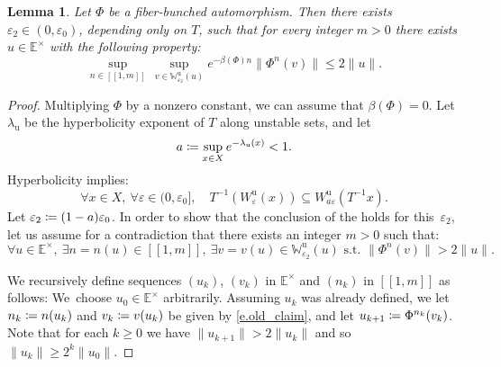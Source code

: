 \documentclass[10pt]{amsart}
\newcommand{\ldbrack}{[\![}
\newcommand{\rdbrack}{]\!]}
\def\vcentcolon{\mathrel{\mathop\ordinarycolon}}
\providecommand\ordinarycolon{:}
\providecommand*\coloneqq{\vcentcolon\mathrel{\mkern-1.2mu}=}
\theoremstyle{plain}
\newtheorem{lemma}[theorem]{Lemma}
\theoremstyle{definition}
\newcommand{\EE}{\mathbb{E}}
\newcommand{\WW}{\mathbb{W}}
\newcommand{\uu}{\mathrm{u}}
\let\epsilon\varepsilon
\begin{document}
\begin{lemma}\label{l.anti_claim}
Let $\Phi$ be a fiber-bunched automorphism.
Then there exists $\epsilon_2 \in (0,\epsilon_0)$, depending only on $T$, such that for every integer $m > 0$ there exists $u \in \EE^\times$ with the following property:
\[
\sup_{n \in \ldbrack 1, m \rdbrack} \, \sup_{v \in \WW^\uu_{\epsilon_2} (u)} e^{-\beta(\Phi) n} \| \Phi^n (v) \| \le 2 \|u\|.
\]
\end{lemma}

\begin{proof}
Multiplying $\Phi$ by a nonzero constant, we can assume that $\beta(\Phi) = 0$.
Let~$\lambda_\uu$ be the hyperbolicity exponent of $T$ along unstable sets, and let
\begin{equation}\label{e.hyp_rate}
a \coloneqq \sup_{x \in X} e^{-\lambda_\uu(x)} < 1.
\end{equation}
Hyperbolicity implies:
\begin{equation}\label{e.W_contraction}
\forall x \in X, \ \forall \epsilon \in (0, \epsilon_0], \quad
T^{-1}(W^\uu_\epsilon(x)) \subseteq W^\uu_{a\epsilon}(T^{-1} x).
\end{equation}
Let $\epsilon_2 \coloneqq (1-a)\epsilon_0$.
In order to show that the conclusion of the  holds for this~$\epsilon_2$,
let us assume for a contradiction that there exists an integer $m > 0$
such that:
\begin{equation}\label{e.old_claim}
\forall u \in \EE^\times, \
\exists n=n(u) \in \ldbrack 1, m \rdbrack, \
\exists v=v(u) \in \WW^\uu_{\epsilon_2} (u) \text{ s.t.\ }
\| \Phi^n (v) \| > 2 \|u\|.
\end{equation}

We recursively define sequences $(u_k)$, $(v_k)$ in $\EE^\times$ and $(n_k)$ in $\ldbrack 1, m \rdbrack$ as follows:
We~choose $u_0 \in \EE^\times$ arbitrarily.
Assuming $u_k$ was already defined, we let $n_k \coloneqq n(u_k)$ and $v_k \coloneqq v(u_k)$ be given by \eqref{e.old_claim}, and let $u_{k+1} \coloneqq \Phi^{n_k}(v_k)$.
Note that for each $k\ge 0$ we have
$\|u_{k+1}\| > 2 \|u_k\|$ and so $\| u_k \| \ge 2^k \|u_0\|$.


\end{proof}
\end{document}
